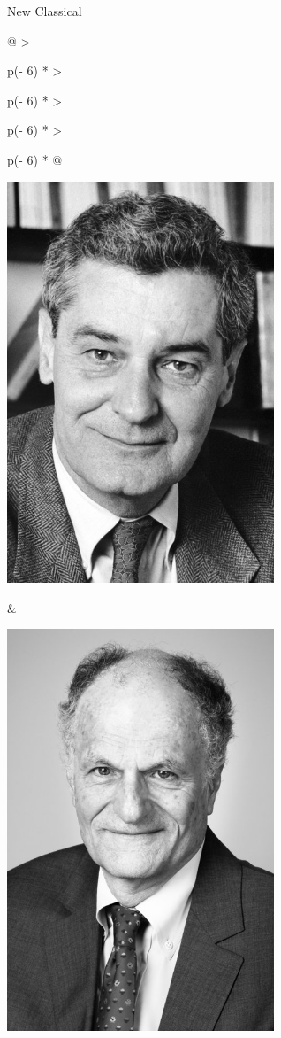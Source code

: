 \begin{frame}{New Classical}
\protect\hypertarget{new-classical}{}


\begin{longtable}[]{@{}
  >{\raggedright\arraybackslash}p{(\columnwidth - 6\tabcolsep) * }
  >{\raggedright\arraybackslash}p{(\columnwidth - 6\tabcolsep) * }
  >{\raggedright\arraybackslash}p{(\columnwidth - 6\tabcolsep) * }
  >{\raggedright\arraybackslash}p{(\columnwidth - 6\tabcolsep) * }@{}}
\toprule\noalign{}
\begin{minipage}[b]{\linewidth}\raggedright
\includegraphics[width=0.6\textwidth,height=\textheight]{assets/lucas.jpg}
\end{minipage} & \begin{minipage}[b]{\linewidth}\raggedright
\includegraphics[width=0.6\textwidth,height=\textheight]{assets/sargent.jpg}

\end{minipage}
\end{longtable}
\end{frame}
